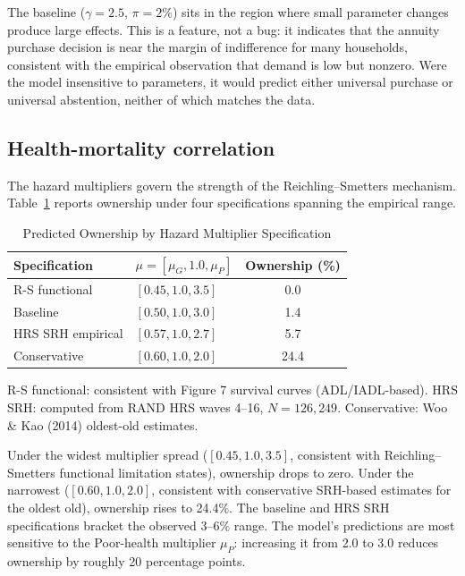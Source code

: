 \documentclass[12pt]{article}
\begin{document}
The baseline ($\gamma = 2.5$, $\pi = 2\%$) sits in the region where small parameter changes produce large effects. This is a feature, not a bug: it indicates that the annuity purchase decision is near the margin of indifference for many households, consistent with the empirical observation that demand is low but nonzero. Were the model insensitive to parameters, it would predict either universal purchase or universal abstention, neither of which matches the data.

\subsection{Health-mortality correlation}

The hazard multipliers govern the strength of the Reichling--Smetters mechanism. Table~\ref{tab:hazard_sensitivity} reports ownership under four specifications spanning the empirical range.

\begin{table}[htbp]
\centering
\caption{Predicted Ownership by Hazard Multiplier Specification}
\label{tab:hazard_sensitivity}
\begin{tabular}{llc}
\toprule
Specification & $\mu = [\mu_G, 1.0, \mu_P]$ & Ownership (\%) \\
\midrule
R-S functional & $[0.45, 1.0, 3.5]$ & 0.0 \\
Baseline & $[0.50, 1.0, 3.0]$ & 1.4 \\
HRS SRH empirical & $[0.57, 1.0, 2.7]$ & 5.7 \\
Conservative & $[0.60, 1.0, 2.0]$ & 24.4 \\
\bottomrule
\end{tabular}
\begin{tablenotes}
\small
\item R-S functional: consistent with \citet{reichlingsmetters2015} Figure 7 survival curves (ADL/IADL-based). HRS SRH: computed from RAND HRS waves 4--16, $N = 126{,}249$. Conservative: Woo \& Kao (2014) oldest-old estimates.
\end{tablenotes}
\end{table}

Under the widest multiplier spread ($[0.45, 1.0, 3.5]$, consistent with Reichling--Smetters functional limitation states), ownership drops to zero. Under the narrowest ($[0.60, 1.0, 2.0]$, consistent with conservative SRH-based estimates for the oldest old), ownership rises to 24.4\%. The baseline and HRS SRH specifications bracket the observed 3--6\% range. The model's predictions are most sensitive to the Poor-health multiplier $\mu_P$: increasing it from 2.0 to 3.0 reduces ownership by roughly 20 percentage points.
\end{document}
